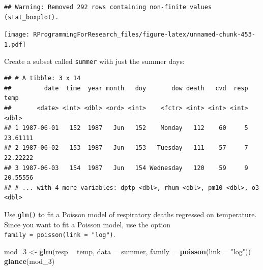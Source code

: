 \documentclass[]{book}
\makeatletter
\newenvironment{Shaded}{\begin{snugshade}}{\end{snugshade}}
\newcommand{\KeywordTok}[1]{\textcolor[rgb]{0.13,0.29,0.53}{\textbf{#1}}}
\newcommand{\DataTypeTok}[1]{\textcolor[rgb]{0.13,0.29,0.53}{#1}}
\newcommand{\DecValTok}[1]{\textcolor[rgb]{0.00,0.00,0.81}{#1}}
\newcommand{\StringTok}[1]{\textcolor[rgb]{0.31,0.60,0.02}{#1}}
\newcommand{\OtherTok}[1]{\textcolor[rgb]{0.56,0.35,0.01}{#1}}
\newcommand{\OperatorTok}[1]{\textcolor[rgb]{0.81,0.36,0.00}{\textbf{#1}}}
\newcommand{\NormalTok}[1]{#1}
\newenvironment{kframe}{%
\medskip{}
\setlength{\fboxsep}{.8em}
 \def\at@end@of@kframe{}%
 \ifinner\ifhmode%
  \def\at@end@of@kframe{\end{minipage}}%
  \begin{minipage}{\columnwidth}%
 \fi\fi%
 \def\FrameCommand##1{\hskip\@totalleftmargin \hskip-\fboxsep
 \colorbox{shadecolor}{##1}\hskip-\fboxsep
     \hskip-\linewidth \hskip-\@totalleftmargin \hskip\columnwidth}%
 \MakeFramed {\advance\hsize-\width
   \@totalleftmargin\z@ \linewidth\hsize
   \@setminipage}}%
 {\par\unskip\endMakeFramed%
 \at@end@of@kframe}
\renewenvironment{Shaded}{\begin{kframe}}{\end{kframe}}
\theoremstyle{definition}
\theoremstyle{definition}
\theoremstyle{definition}
\theoremstyle{remark}
\makeatother
\begin{document}
\begin{verbatim}
## Warning: Removed 292 rows containing non-finite values (stat_boxplot).
\end{verbatim}

\texttt{[image: RProgrammingForResearch\_files/figure-latex/unnamed-chunk-453-1.pdf]}

Create a subset called \texttt{summer} with just the summer days:

\begin{Shaded}
\end{Shaded}

\begin{verbatim}
## # A tibble: 3 x 14
##         date  time  year month   doy       dow death   cvd  resp     temp
##       <date> <int> <dbl> <ord> <int>    <fctr> <int> <int> <int>    <dbl>
## 1 1987-06-01   152  1987   Jun   152    Monday   112    60     5 23.61111
## 2 1987-06-02   153  1987   Jun   153   Tuesday   111    57     7 22.22222
## 3 1987-06-03   154  1987   Jun   154 Wednesday   120    59     9 20.55556
## # ... with 4 more variables: dptp <dbl>, rhum <dbl>, pm10 <dbl>, o3 <dbl>
\end{verbatim}

Use \texttt{glm()} to fit a Poisson model of respiratory deaths
regressed on temperature. Since you want to fit a Poisson model, use the
option \texttt{family\ =\ poisson(link\ =\ "log")}.

\begin{Shaded}
\begin{Highlighting}[]
\NormalTok{mod_}\DecValTok{3}\NormalTok{ <-}\StringTok{ }\KeywordTok{glm}\NormalTok{(resp }\OperatorTok{~}\StringTok{ }\NormalTok{temp, }\DataTypeTok{data =}\NormalTok{ summer,}
             \DataTypeTok{family =} \KeywordTok{poisson}\NormalTok{(}\DataTypeTok{link =} \StringTok{"log"}\NormalTok{))}
\KeywordTok{glance}\NormalTok{(mod_}\DecValTok{3}\NormalTok{)}
\end{Highlighting}
\end{Shaded}
\end{document}
